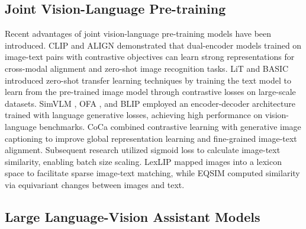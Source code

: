 \subsection{Joint Vision-Language Pre-training}
Recent advantages of joint vision-language pre-training models have been introduced.
CLIP \cite{radford2021learning} and ALIGN \cite{jia2021scaling} demonstrated that dual-encoder models trained on image-text pairs with contrastive objectives can learn strong representations for cross-modal alignment and zero-shot image recognition tasks.
LiT \cite{zhai2022lit} and BASIC \cite{pham2023combined} introduced zero-shot transfer learning techniques by training the text model to learn from the pre-trained image model through contrastive losses on large-scale datasets.
SimVLM \cite{wang2021simvlm}, OFA \cite{wang2022ofa}, and BLIP \cite{li2022blip} employed an encoder-decoder architecture trained with language generative losses, achieving high performance on vision-language benchmarks.
CoCa \cite{yu2022coca} combined contrastive learning with generative image captioning to improve global representation learning and fine-grained image-text alignment.
Subsequent research \cite{zhai2023sigmoid} utilized sigmoid loss to calculate image-text similarity, enabling batch size scaling.
LexLIP \cite{luo2023lexlip} mapped images into a lexicon space to facilitate sparse image-text matching, while EQSIM \cite{wang2023equivariant} computed similarity via equivariant changes between images and text.

\subsection{Large Language-Vision Assistant Models}

